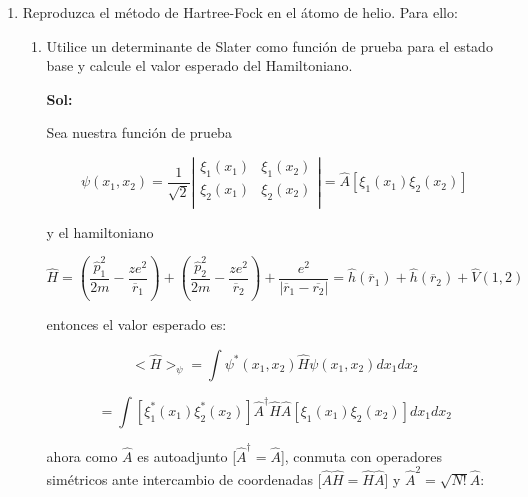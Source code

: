 \documentclass[12pt,a4paper]{article}
\begin{document}
\begin{enumerate}



\item Reproduzca el método de Hartree-Fock en el átomo de helio. Para ello:

\begin{enumerate}
    \item Utilice un determinante de Slater como función de prueba para el estado base y calcule el valor esperado del Hamiltoniano.
    
    \textbf{Sol:}
    
    Sea nuestra función de prueba
    
    \begin{equation*}
        \psi (x_1,x_2) = \frac{1}{\sqrt{2}} \left|\begin{matrix}
    \xi_{1} (x_1) & \xi_1 (x_2)  \\
    \xi_{2} (x_1) & \xi_{2} (x_2)  \\

    \end{matrix}\right|  =\hat{A} [\xi_1 (x_1) \xi_2 (x_2)]
    \end{equation*} 
    
    y el hamiltoniano
    
    \begin{equation*}
        \hat{H} = \left(\frac{\hat{p}_{1}^{2}}{2m} - \frac{z e^2}{\overline{r}_1}\right) + \left(\frac{\hat{p}_{2}^{2}}{2m} - \frac{z e^2}{\overline{r}_2}\right) + \frac{e^2}{|\overline{r}_1 - \overline{r_2}|} =\hat{h} (\overline{r}_1) + \hat{h} (\overline{r}_2) + \hat{V}(1,2)
    \end{equation*}
    
    entonces el valor esperado es:
    
    \begin{equation*}
        <\hat{H}>_\psi = \int \psi^{*} (x_1,x_2) \hat{H} \psi(x_1,x_2) d x_1 dx_2
    \end{equation*}
    
    \begin{equation*}
        = \int  [\xi_{1}^{*} (x_1) \xi_{2}^{*} (x_2)] \hat{A}^{\dagger} \hat{H} \hat{A} [\xi_{1} (x_1) \xi_{2} (x_2)] d x_1 dx_2
    \end{equation*}
    
    ahora como $\hat{A}$ es autoadjunto [$\hat{A}^{\dagger} = \hat{A}$], conmuta con operadores simétricos ante intercambio de coordenadas [$\hat{A}\hat{H} = \hat{H}\hat{A}$] y $\hat{A}^2 = \sqrt{N!} \hat{A}$:
    

\end{enumerate}
\end{enumerate}
\end{document}
